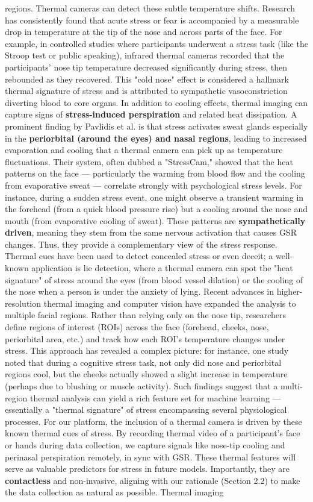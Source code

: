 regions. Thermal cameras can detect these subtle temperature shifts. Research has consistently found that acute stress or fear is accompanied by a measurable drop in temperature at the tip of the nose and across parts of the face. For example, in controlled studies where participants underwent a stress task (like the Stroop test or public speaking), infrared thermal cameras recorded that the participants' nose tip temperature decreased significantly during stress, then rebounded as they recovered. This "cold nose" effect is considered a hallmark thermal signature of stress and is attributed to sympathetic vasoconstriction diverting blood to core organs. In addition to cooling effects, thermal imaging can capture signs of \textbf{stress-induced perspiration} and related heat dissipation. A prominent finding by Pavlidis et al. is that stress activates sweat glands especially in the \textbf{periorbital (around the eyes) and nasal regions}, leading to increased evaporation and cooling that a thermal camera can pick up as temperature fluctuations. Their system, often dubbed a "StressCam," showed that the heat patterns on the face --- particularly the warming from blood flow and the cooling from evaporative sweat --- correlate strongly with psychological stress levels. For instance, during a sudden stress event, one might observe a transient warming in the forehead (from a quick blood pressure rise) but a cooling around the nose and mouth (from evaporative cooling of sweat). These patterns are \textbf{sympathetically driven}, meaning they stem from the same nervous activation that causes GSR changes. Thus, they provide a complementary view of the stress response. Thermal cues have been used to detect concealed stress or even deceit; a well-known application is lie detection, where a thermal camera can spot the "heat signature" of stress around the eyes (from blood vessel dilation) or the cooling of the nose when a person is under the anxiety of lying. Recent advances in higher-resolution thermal imaging and computer vision have expanded the analysis to multiple facial regions. Rather than relying only on the nose tip, researchers define regions of interest (ROIs) across the face (forehead, cheeks, nose, periorbital area, etc.) and track how each ROI's temperature changes under stress. This approach has revealed a complex picture: for instance, one study noted that during a cognitive stress task, not only did nose and periorbital regions cool, but the cheeks actually showed a slight increase in temperature (perhaps due to blushing or muscle activity). Such findings suggest that a multi-region thermal analysis can yield a rich feature set for machine learning --- essentially a "thermal signature" of stress encompassing several physiological processes. For our platform, the inclusion of a thermal camera is driven by these known thermal cues of stress. By recording thermal video of a participant's face or hands during data collection, we capture signals like nose-tip cooling and perinasal perspiration remotely, in sync with GSR. These thermal features will serve as valuable predictors for stress in future models. Importantly, they are \textbf{contactless} and non-invasive, aligning with our rationale (Section 2.2) to make the data collection as natural as possible. Thermal imaging 